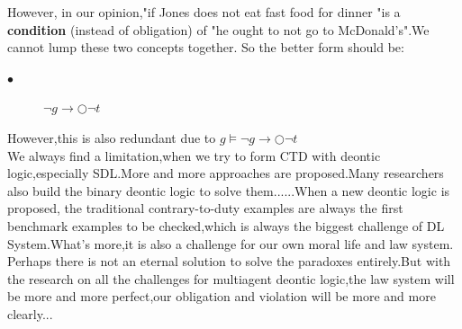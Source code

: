 \documentclass{article}
\begin{document}
However, in our opinion,"if Jones does not eat fast food for dinner "is a \textbf{condition} (instead of obligation) of "he ought to not go to McDonald's".We cannot lump these two concepts together.
So the better form should be:
\begin{description}
\item[$\bullet$]$ \neg g \rightarrow \bigcirc \neg t$
\end{description}
However,this is also redundant due to $g \vDash\neg g \rightarrow \bigcirc \neg t $\\We always find a limitation,when we try to form CTD with deontic logic,especially SDL.More and more approaches are proposed.Many researchers also build the binary deontic logic to solve them......When a new deontic logic is proposed, the traditional contrary-to-duty examples are always the first benchmark examples to be checked,which is always the biggest challenge of DL System.What's more,it is also a challenge for our own moral life and law system.
Perhaps there is not an eternal solution to solve the paradoxes entirely.But with the research on all the challenges for multiagent deontic logic,the law system will be more and more perfect,our obligation and violation will be more and more clearly... 



\end{document}
